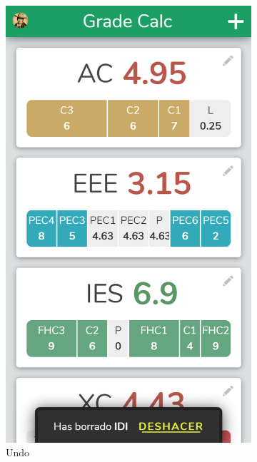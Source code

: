 \begin{figure}[ht!]
\begin{subfigure}[b]{0.25\textwidth-0.1cm}
        \includegraphics[width=\textwidth]{media/screenshots/screenshot-notification-undo.png}
        \caption{Undo}
    \end{subfigure}
    \hfill
    \begin{subfigure}[b]{0.25\textwidth-0.1cm}
        \centering

\end{subfigure}
\end{figure}
